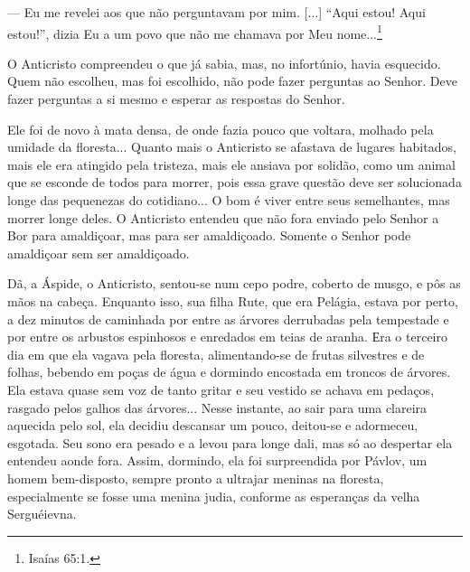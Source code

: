 --- Eu me revelei aos que não perguntavam por mim. {[}...{]} ``Aqui
estou! Aqui estou!'', dizia Eu a um povo que não me chamava por Meu
nome...\footnote{Isaías 65:1.}

O Anticristo compreendeu o que já sabia, mas, no infortúnio, havia
esquecido. Quem não escolheu, mas foi escolhido, não pode fazer
perguntas ao Senhor. Deve fazer perguntas a si mesmo e esperar as
respostas do Senhor.

Ele foi de novo à mata densa, de onde fazia pouco que voltara, molhado
pela umidade da floresta... Quanto mais o Anticristo se afastava de
lugares habitados, mais ele era atingido pela tristeza, mais ele ansiava
por solidão, como um animal que se esconde de todos para morrer, pois
essa grave questão deve ser solucionada longe das pequenezas do
cotidiano... O bom é viver entre seus semelhantes, mas morrer longe
deles. O Anticristo entendeu que não fora enviado pelo Senhor a Bor para
amaldiçoar, mas para ser amaldiçoado. Somente o Senhor pode amaldiçoar
sem ser amaldiçoado.

Dã, a Áspide, o Anticristo, sentou-se num cepo podre, coberto de musgo,
e pôs as mãos na cabeça. Enquanto isso, sua filha Rute, que era Pelágia,
estava por perto, a dez minutos de caminhada por entre as árvores
derrubadas pela tempestade e por entre os arbustos espinhosos e
enredados em teias de aranha. Еra o terceiro dia em que ela vagava pela
floresta, alimentando-se de frutas silvestres e de folhas, bebendo em
poças de água e dormindo encostada em troncos de árvores. Ela estava
quase sem voz de tanto gritar e seu vestido se achava em pedaços,
rasgado pelos galhos das árvores... Nesse instante, ao sair para uma
clareira aquecida pelo sol, ela decidiu descansar um pouco, deitou-se e
adormeceu, esgotada. Seu sono era pesado e a levou para longe dali, mas
só ao despertar ela entendeu aonde fora. Assim, dormindo, ela foi
surpreendida por Pávlov, um homem bem-disposto, sempre pronto a ultrajar
meninas na floresta, especialmente se fosse uma menina judia, conforme
as esperanças da velha Serguéievna.

